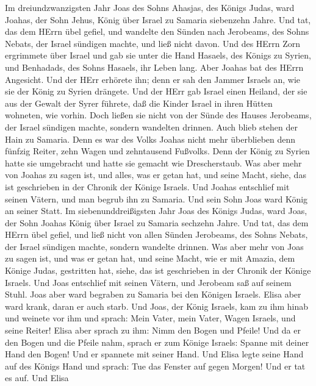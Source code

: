  Im dreiundzwanzigsten Jahr Joas des Sohns Ahasjas, des
Königs Judas, ward Joahas, der Sohn Jehus, König über Israel zu Samaria
siebenzehn Jahre.  Und tat, das dem HErrn übel gefiel, und
wandelte den Sünden nach Jerobeams, des Sohns Nebats, der Israel
sündigen machte, und ließ nicht davon.  Und des HErrn Zorn
ergrimmete über Israel und gab sie unter die Hand Hasaels, des Königs zu
Syrien, und Benhadads, des Sohns Hasaels, ihr Leben lang. 
Aber Joahas bat des HErrn Angesicht. Und der HErr erhörete ihn; denn er
sah den Jammer Israels an, wie sie der König zu Syrien drängete.
 Und der HErr gab Israel einen Heiland, der sie aus der
Gewalt der Syrer führete, daß die Kinder Israel in ihren Hütten
wohneten, wie vorhin.  Doch ließen sie nicht von der Sünde
des Hauses Jerobeams, der Israel sündigen machte, sondern wandelten
drinnen. Auch blieb stehen der Hain zu Samaria.  Denn es war
des Volks Joahas nicht mehr überblieben denn fünfzig Reiter, zehn Wagen
und zehntausend Fußvolks. Denn der König zu Syrien hatte sie umgebracht
und hatte sie gemacht wie Drescherstaub.  Was aber mehr von
Joahas zu sagen ist, und alles, was er getan hat, und seine Macht,
siehe, das ist geschrieben in der Chronik der Könige Israels.
 Und Joahas entschlief mit seinen Vätern, und man begrub ihn
zu Samaria. Und sein Sohn Joas ward König an seiner Statt. 
Im siebenunddreißigsten Jahr Joas des Königs Judas, ward Joas, der Sohn
Joahas König über Israel zu Samaria sechzehn Jahre.  Und
tat, das dem HErrn übel gefiel, und ließ nicht von allen Sünden
Jerobeams, des Sohns Nebats, der Israel sündigen machte, sondern
wandelte drinnen.  Was aber mehr von Joas zu sagen ist, und
was er getan hat, und seine Macht, wie er mit Amazia, dem Könige Judas,
gestritten hat, siehe, das ist geschrieben in der Chronik der Könige
Israels.  Und Joas entschlief mit seinen Vätern, und
Jerobeam saß auf seinem Stuhl. Joas aber ward begraben zu Samaria bei
den Königen Israels.  Elisa aber ward krank, daran er auch
starb. Und Joas, der König Israels, kam zu ihm hinab und weinete vor ihm
und sprach: Mein Vater, mein Vater, Wagen Israels, und seine Reiter!
 Elisa aber sprach zu ihm: Nimm den Bogen und Pfeile! Und
da er den Bogen und die Pfeile nahm,  sprach er zum Könige
Israels: Spanne mit deiner Hand den Bogen! Und er spannete mit seiner
Hand. Und Elisa legte seine Hand auf des Königs Hand  und
sprach: Tue das Fenster auf gegen Morgen! Und er tat es auf. Und Elisa
